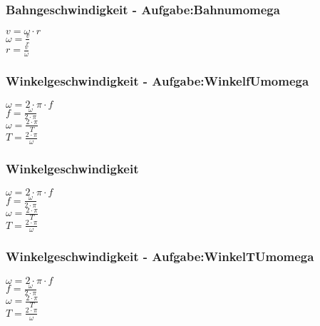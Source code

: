 \subsubsection{Bahngeschwindigkeit - Aufgabe:Bahnumomega} 
\begin{minipage}{0.45\textwidth} 
$ v = \omega \cdot r $\\ 
$ \omega  = \frac{v}{r} $\\ 
$ r = \frac{v}{\omega } $\\ 
\end{minipage} 
\begin{minipage}{0.45\textwidth} 
 
\end{minipage} 
\subsubsection{Winkelgeschwindigkeit - Aufgabe:WinkelfUmomega} 
\begin{minipage}{0.45\textwidth} 
$ \omega  = 2\cdot \pi \cdot f $\\ 
$ f = \frac{\omega }{2\cdot \pi } $\\ 
$ \omega  = \frac{2\cdot \pi }{ T} $\\ 
$ T = \frac{2\cdot \pi }{ \omega } $\\ 
\end{minipage} 
\begin{minipage}{0.45\textwidth} 
 
\end{minipage} 
\subsubsection{Winkelgeschwindigkeit} 
\begin{minipage}{0.45\textwidth} 
$ \omega  = 2\cdot \pi \cdot f $\\ 
$ f = \frac{\omega }{2\cdot \pi } $\\ 
$ \omega  = \frac{2\cdot \pi }{ T} $\\ 
$ T = \frac{2\cdot \pi }{ \omega } $\\ 
\end{minipage} 
\begin{minipage}{0.45\textwidth} 
 
\end{minipage} 
\subsubsection{Winkelgeschwindigkeit - Aufgabe:WinkelTUmomega} 
\begin{minipage}{0.45\textwidth} 
$ \omega  = 2\cdot \pi \cdot f $\\ 
$ f = \frac{\omega }{2\cdot \pi } $\\ 
$ \omega  = \frac{2\cdot \pi }{ T} $\\ 
$ T = \frac{2\cdot \pi }{ \omega } $\\ 
\end{minipage} 
\begin{minipage}{0.45\textwidth} 
 
\end{minipage} 

